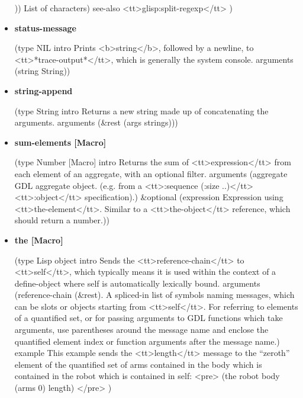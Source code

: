 \documentclass [11pt]{book}
\begin{document}
\begin{itemize}
 	))
  List of characters)
 see-also <tt>glisp:split-regexp</tt> 
)



\item {}
\label{prim:status-message}
\textbf{status-message}

(type NIL intro
  Prints <b>string</b>, followed by a newline, to <tt>*trace-output*</tt>,
which is generally the system console.
 arguments (string String))



\item {}
\label{prim:string-append}
\textbf{string-append}

(type String intro
  Returns a new string made up of concatenating the arguments.
 arguments (\&rest (args strings)))



\item {}
\label{prim:sum-elements}
\textbf{sum-elements [Macro]}

(type Number [Macro] intro
  Returns the sum of <tt>expression</tt> from each element of an aggregate,
with an optional filter.
 arguments
 (aggregate
  GDL aggregate object. (e.g. from a <tt>:sequence (:size ..)</tt> <tt>:object</tt> specification).)
 \&optional
 (expression
  Expression using <tt>the-element</tt>. Similar to a <tt>the-object</tt> reference, which should return a number.))



\item {}
\label{prim:the}
\textbf{the [Macro]}

(type Lisp object intro
  Sends the <tt>reference-chain</tt> to <tt>self</tt>, which typically means it is
used within the context of a define-object where self is automatically lexically bound.
 arguments
 (reference-chain
  (\&rest). A spliced-in list of symbols naming messages, which can 
be slots or objects starting from <tt>self</tt>. For referring to elements of a quantified set,
or for passing arguments to GDL functions which take arguments, use parentheses around the
message name and enclose the quantified element index or function arguments after the message
name.)
 example 
This example sends the <tt>length</tt> message to the ``zeroth'' element of the quantified
set of arms contained in the body which is contained in the robot which is contained in self:
<pre>
 (the robot body (arms 0) length)
</pre>
)




\end{itemize}
\end{document}
